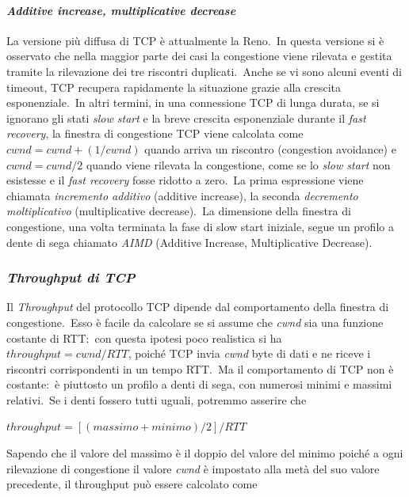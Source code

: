 \paragraph{\emph{Additive increase, multiplicative decrease}}

La versione più diffusa di TCP è attualmente la Reno.\
In questa versione si è osservato che nella maggior parte dei casi la congestione viene rilevata e gestita tramite la rilevazione dei tre riscontri duplicati.\
Anche se vi sono alcuni eventi di timeout, TCP recupera rapidamente la situazione grazie alla crescita esponenziale.\
In altri termini, in una connessione TCP di lunga durata, se si ignorano gli stati \emph{slow start} e la breve crescita esponenziale durante il \emph{fast recovery}, la finestra di congestione TCP viene calcolata come $cwnd = cwnd + (1/cwnd)$ quando arriva un riscontro (congestion avoidance) e $cwnd=cwnd/2$ quando viene rilevata la congestione, come se lo \emph{slow start} non esistesse e il \emph{fast recovery} fosse ridotto a zero.\
La prima espressione viene chiamata \emph{incremento additivo} (additive increase), la seconda \emph{decremento moltiplicativo} (multiplicative decrease).\
La dimensione della finestra di congestione, una volta terminata la fase di slow start iniziale, segue un profilo a dente di sega chiamato \emph{AIMD} (Additive Increase, Multiplicative Decrease).

\subsubsection{\emph{Throughput di TCP}}

Il \emph{Throughput} del protocollo TCP dipende dal comportamento della finestra di congestione.\
Esso è facile da calcolare se si assume che \emph{cwnd} sia una funzione costante di RTT:\ con questa ipotesi poco realistica si ha $throughput = cwnd/RTT$, poiché TCP invia \emph{cwnd} byte di dati e ne riceve i riscontri corrispondenti in un tempo RTT.\
Ma il comportamento di TCP non è costante:\ è piuttosto un profilo a denti di sega, con numerosi minimi e massimi relativi.\
Se i denti fossero tutti uguali, potremmo asserire che

\begin{center}
    $throughput = [(massimo+minimo)/2]/RTT$
\end{center}

Sapendo che il valore del massimo è il doppio del valore del minimo poiché a ogni rilevazione di congestione il valore \emph{cwnd} è impostato alla metà del suo valore precedente, il throughput può essere calcolato come

